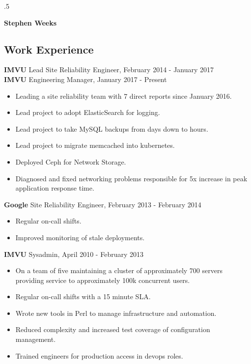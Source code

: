 \documentclass[line]{res}
\begin{document}
\moveleft.5\hoffset\centerline{\Huge\textbf{Stephen Weeks}}

\address{801.634.5859 tene@allalone.org}

\begin{resume}

\section{Work Experience}
\textbf{IMVU} Lead Site Reliability Engineer, February 2014 - January 2017\\
\textbf{IMVU} Engineering Manager, January 2017 - Present
\begin{itemize}
\item Leading a site reliability team with 7 direct reports since January 2016.
\item Lead project to adopt ElasticSearch for logging.
\item Lead project to take MySQL backups from days down to hours.
\item Lead project to migrate memcached into kubernetes.
\item Deployed Ceph for Network Storage.
\item Diagnosed and fixed networking problems responsible for 5x increase in peak application response time.
\end{itemize}

\textbf{Google} Site Reliability Engineer, February 2013 - February 2014
\begin{itemize}
\item Regular on-call shifts.
\item Improved monitoring of stale deployments.
\end{itemize}

\textbf{IMVU} Sysadmin, April 2010 - February 2013
\begin{itemize}
\item On a team of five maintaining a cluster of approximately 700 servers providing service to approximately 100k concurrent users.
\item Regular on-call shifts with a 15 minute SLA.
\item Wrote new tools in Perl to manage infrastructure and automation.
\item Reduced complexity and increased test coverage of configuration management.
\item Trained engineers for production access in devops roles.
\end{itemize}


\end{resume}
\end{document}

